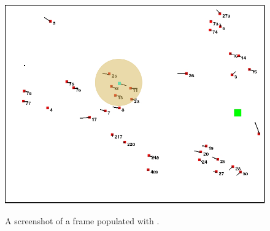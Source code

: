 %


\begin{figure}[!htbp]
	\label{fig:agent-perspective-risk-features}
		\centering
		\includegraphics[width=.95\textwidth]{figures/env_screenshot_agent_perspective.png}
		\label{fig:agent-perspective_env}
		\centering
		\caption{A screenshot of a frame populated with .} 
\end{figure}

